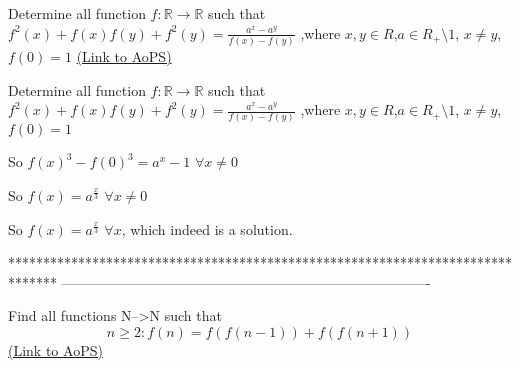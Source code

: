 \begin{problem}
	Determine all function $f: \mathbb{R}\to\mathbb{R}$ such that $f^2(x)+f(x)f(y)+f^2(y)=\frac{a^x-a^y}{f(x)-f(y)}$ ,where $x,y{\in}R$,$a{\in}R_+{\setminus}{1}$, $x{\neq}y$, $f(0)=1$
	\flushright \href{https://artofproblemsolving.com/community/c6h569607}{(Link to AoPS)}
\end{problem}



\begin{solution}
	\begin{tcolorbox}Determine all function $f: \mathbb{R}\to\mathbb{R}$ such that $f^2(x)+f(x)f(y)+f^2(y)=\frac{a^x-a^y}{f(x)-f(y)}$ ,where $x,y{\in}R$,$a{\in}R_+{\setminus}{1}$, $x{\neq}y$, $f(0)=1$\end{tcolorbox}
So $f(x)^3-f(0)^3=a^x-1$ $\forall x\ne 0$

So $f(x)=a^{\frac x3}$ $\forall x\ne 0$

So $\boxed{f(x)=a^{\frac x3}}$ $\forall x$, which indeed is a solution.
\end{solution}
*******************************************************************************
-------------------------------------------------------------------------------

\begin{problem}
	Find all functions N-->N such that
\[n\geq2 : f(n)=f(f(n-1))+f(f(n+1))\]
	\flushright \href{https://artofproblemsolving.com/community/c6h569748}{(Link to AoPS)}
\end{problem}



